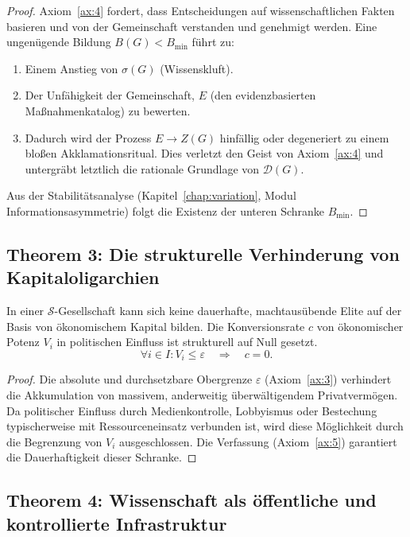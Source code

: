 \begin{proof}
    Axiom~\ref{ax:4} fordert, dass Entscheidungen auf wissenschaftlichen Fakten basieren und von der Gemeinschaft verstanden und genehmigt werden. Eine ungenügende Bildung $B(G) < B_{\min}$ führt zu:
    \begin{enumerate}
        \item Einem Anstieg von $\sigma(G)$ (Wissenskluft).
        \item Der Unfähigkeit der Gemeinschaft, $E$ (den evidenzbasierten Maßnahmenkatalog) zu bewerten.
        \item Dadurch wird der Prozess $E \to Z(G)$ hinfällig oder degeneriert zu einem bloßen Akklamationsritual. Dies verletzt den Geist von Axiom~\ref{ax:4} und untergräbt letztlich die rationale Grundlage von $\mathcal{D}(G)$.
    \end{enumerate}
    Aus der Stabilitätsanalyse (Kapitel~\ref{chap:variation}, Modul Informationsasymmetrie) folgt die Existenz der unteren Schranke $B_{\min}$.
\end{proof}

\subsection{Theorem 3: Die strukturelle Verhinderung von Kapitaloligarchien}

\begin{theorem}
    In einer $\mathcal{S}$-Gesellschaft kann sich keine dauerhafte, machtausübende Elite auf der Basis von ökonomischem Kapital bilden. Die Konversionsrate $c$ von ökonomischer Potenz $V_i$ in politischen Einfluss ist strukturell auf Null gesetzt.
    \[
    \boxed{\forall i \in I: V_i \leq \varepsilon \quad \Rightarrow \quad c = 0.}
    \]
\end{theorem}

\begin{proof}
    Die absolute und durchsetzbare Obergrenze $\varepsilon$ (Axiom~\ref{ax:3}) verhindert die Akkumulation von massivem, anderweitig überwältigendem Privatvermögen. Da politischer Einfluss durch Medienkontrolle, Lobbyismus oder Bestechung typischerweise mit Ressourceneinsatz verbunden ist, wird diese Möglichkeit durch die Begrenzung von $V_i$ ausgeschlossen. Die Verfassung (Axiom~\ref{ax:5}) garantiert die Dauerhaftigkeit dieser Schranke.
\end{proof}

\subsection{Theorem 4: Wissenschaft als öffentliche und kontrollierte Infrastruktur}

